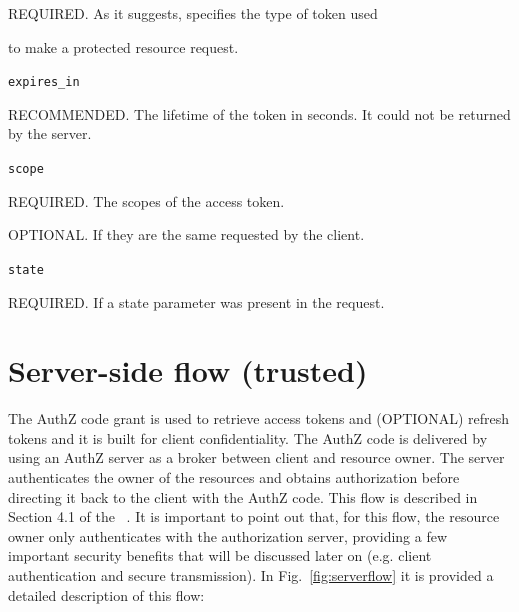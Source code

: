 \hspace{0.5cm}REQUIRED. As it suggests, specifies the type of token used

\hspace{0.5cm}to make a protected resource request.

\texttt{expires\_in}

\hspace{0.5cm}RECOMMENDED. The lifetime of the token in seconds. It could not be returned by the server.

\texttt{scope}

\hspace{0.5cm}REQUIRED. The scopes of the access token.

\hspace{0.5cm}OPTIONAL. If they are the same requested by the client.

\texttt{state}

\hspace{0.5cm}REQUIRED. If a state parameter was present in the request.

\section{Server-side flow (trusted)}
\label{authcg}

The AuthZ code grant is used to retrieve access tokens and (OPTIONAL) refresh tokens and it is built for client confidentiality. The AuthZ code is delivered by using an AuthZ server as a broker between client and resource owner. The server authenticates the owner of the resources and obtains authorization before directing it back to the client with the AuthZ code. This flow is described in Section 4.1 of the \ \cite{RFC6749}. It is important to point out that, for this flow, the resource owner only authenticates with the authorization server, providing a few important security benefits that will be discussed later on (e.g. client authentication and secure transmission). In Fig.~\ref{fig:serverflow} it is provided a detailed description of this flow:

